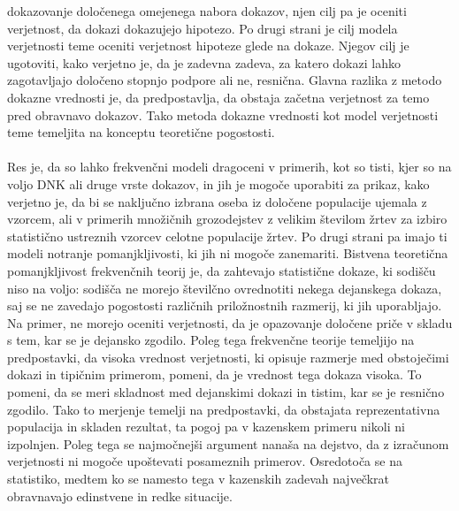 \documentclass[12pt,a4paper]{amsart}
\theoremstyle{definition} %
\theoremstyle{plain} %
\begin{document}
dokazovanje določenega omejenega nabora dokazov, njen cilj pa je oceniti verjetnost, da dokazi dokazujejo hipotezo. Po drugi strani je cilj modela 
verjetnosti teme oceniti verjetnost hipoteze glede na dokaze. Njegov cilj je ugotoviti, kako verjetno je, da je zadevna zadeva, za katero dokazi 
lahko zagotavljajo določeno stopnjo podpore ali ne, resnična. Glavna razlika z metodo dokazne vrednosti je, da predpostavlja, da obstaja začetna 
verjetnost za temo pred obravnavo dokazov. Tako metoda dokazne vrednosti kot model verjetnosti teme temeljita na konceptu teoretične pogostosti.\\\\
Res je, da so lahko frekvenčni modeli dragoceni v primerih, kot so tisti, kjer so na voljo DNK ali druge vrste dokazov, in jih je mogoče uporabiti za 
prikaz, kako verjetno je, da bi se naključno izbrana oseba iz določene populacije ujemala z vzorcem, ali v primerih množičnih grozodejstev z velikim 
številom žrtev za izbiro statistično ustreznih vzorcev celotne populacije žrtev. Po drugi strani pa imajo ti modeli notranje pomanjkljivosti, ki jih 
ni mogoče zanemariti. Bistvena teoretična pomanjkljivost frekvenčnih teorij je, da zahtevajo statistične dokaze, ki sodišču niso na voljo: sodišča ne 
morejo številčno ovrednotiti nekega dejanskega dokaza, saj se ne zavedajo pogostosti različnih priložnostnih razmerij, ki jih uporabljajo. Na primer, 
ne morejo oceniti verjetnosti, da je opazovanje določene priče v skladu s tem, kar se je dejansko zgodilo. Poleg tega frekvenčne teorije temeljijo na 
predpostavki, da visoka vrednost verjetnosti, ki opisuje razmerje med obstoječimi dokazi in tipičnim primerom, pomeni, da je vrednost tega dokaza 
visoka. To pomeni, da se meri skladnost med dejanskimi dokazi in tistim, kar se je resnično zgodilo. Tako to merjenje temelji na predpostavki, da 
obstajata reprezentativna populacija in skladen rezultat, ta pogoj pa v kazenskem primeru nikoli ni izpolnjen. Poleg tega se najmočnejši argument nanaša 
na dejstvo, da z izračunom verjetnosti ni mogoče upoštevati posameznih primerov. Osredotoča se na statistiko, medtem ko se namesto tega v kazenskih 
zadevah največkrat obravnavajo edinstvene in redke situacije.
\end{document}
